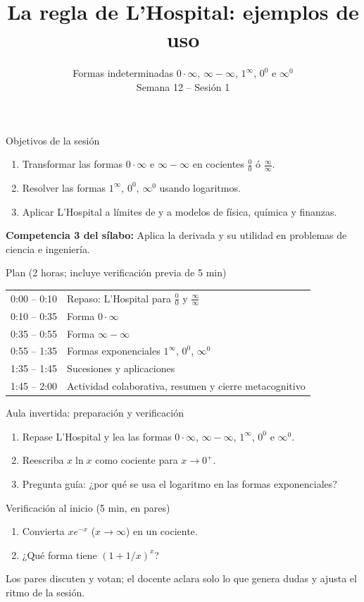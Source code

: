 \documentclass[10pt,aspectratio=169]{beamer}
\title[Formas indeterminadas]{La regla de L'Hospital: ejemplos de uso}
\subtitle{Formas indeterminadas $0\cdot\infty$, $\infty-\infty$, $1^\infty$, $0^0$ e $\infty^0$\\[2pt]\small Semana 12 -- Sesión 1}
\begin{document}
\begin{frame}
  \titlepage
\end{frame}

\begin{frame}{Objetivos de la sesión}
  \begin{enumerate}
    \item Transformar las formas $0\cdot\infty$ e $\infty-\infty$ en cocientes $\frac00$ ó $\frac\infty\infty$.
    \item Resolver las formas  $1^\infty$, $0^0$, $\infty^0$ usando logaritmos.
    \item Aplicar L'Hospital a límites de  y a modelos de física, química y finanzas.
  \end{enumerate}
  \vspace{1mm}
  {\small\textbf{Competencia 3 del sílabo:} Aplica la derivada y su utilidad en problemas de ciencia e ingeniería.}
  \begin{block}{Plan (2 horas; incluye verificación previa de 5 min)}
    \begin{tabular}{ll}
      0:00 -- 0:10 & Repaso: L'Hospital para $\frac00$ y $\frac\infty\infty$\\
      0:10 -- 0:35 & Forma $0\cdot\infty$\\
      0:35 -- 0:55 & Forma $\infty-\infty$\\
      0:55 -- 1:35 & Formas exponenciales $1^\infty$, $0^0$, $\infty^0$\\
      1:35 -- 1:45 & Sucesiones y aplicaciones\\
      1:45 -- 2:00 & Actividad colaborativa, resumen y cierre metacognitivo
    \end{tabular}
  \end{block}
\end{frame}

\begin{frame}{Aula invertida: preparación y verificación}
  \small
  \begin{previa}
    \begin{enumerate}
      \item Repase L'Hospital y lea las formas $0\cdot\infty$, $\infty-\infty$, $1^\infty$, $0^0$ e $\infty^0$.
      \item Reescriba $x\ln x$ como cociente para $x\to0^+$.
      \item Pregunta guía: ¿por qué se usa el logaritmo en las formas exponenciales?
    \end{enumerate}
  \end{previa}
  \begin{block}{Verificación al inicio (5 min, en pares)}
    \begin{enumerate}
      \item Convierta $x e^{-x}$ ($x\to\infty$) en un cociente.
      \item ¿Qué forma tiene $(1+1/x)^x$?
    \end{enumerate}
    Los pares discuten y votan; el docente aclara solo lo que genera dudas y ajusta el ritmo de la sesión.
  \end{block}
\end{frame}
\end{document}

